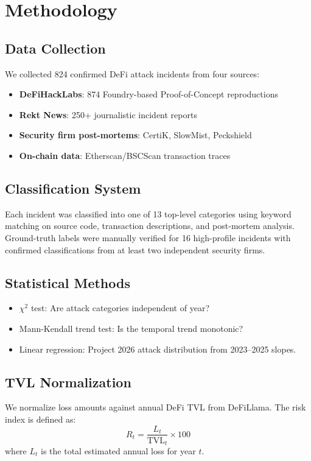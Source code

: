 \documentclass[10pt,conference]{IEEEtran}
\begin{document}
\section{Methodology}

\subsection{Data Collection}
We collected 824 confirmed DeFi attack incidents from four sources:
\begin{itemize}
  \item \textbf{DeFiHackLabs}: 874 Foundry-based Proof-of-Concept reproductions
  \item \textbf{Rekt News}: 250+ journalistic incident reports
  \item \textbf{Security firm post-mortems}: CertiK, SlowMist, Peckshield
  \item \textbf{On-chain data}: Etherscan/BSCScan transaction traces
\end{itemize}

\subsection{Classification System}
Each incident was classified into one of 13 top-level categories using keyword matching on source code, transaction descriptions, and post-mortem analysis. Ground-truth labels were manually verified for 16 high-profile incidents with confirmed classifications from at least two independent security firms.

\subsection{Statistical Methods}
\begin{itemize}
  \item $\chi^2$ test: Are attack categories independent of year?
  \item Mann-Kendall trend test: Is the temporal trend monotonic?
  \item Linear regression: Project 2026 attack distribution from 2023–2025 slopes.
\end{itemize}

\subsection{TVL Normalization}
We normalize loss amounts against annual DeFi TVL from DeFiLlama. The risk index is defined as:
\begin{equation}
R_t = \frac{L_t}{\text{TVL}_t} \times 100
\end{equation}
where $L_t$ is the total estimated annual loss for year $t$.
\end{document}
